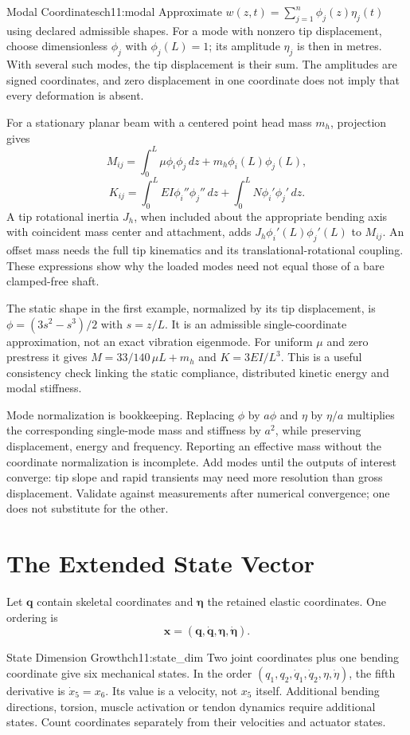 \begin{definition}{Modal Coordinates}{ch11:modal}
Approximate $w(z,t)=\sum_{j=1}^{n}\phi_j(z)\eta_j(t)$ using declared admissible shapes. For a mode with nonzero tip displacement, choose dimensionless $\phi_j$ with $\phi_j(L)=1$; its amplitude $\eta_j$ is then in metres. With several such modes, the tip displacement is their sum. The amplitudes are signed coordinates, and zero displacement in one coordinate does not imply that every deformation is absent.
\end{definition}

For a stationary planar beam with a centered point head mass $m_h$, projection gives
\[
M_{ij}=\int_0^L\mu\phi_i\phi_j\,dz+m_h\phi_i(L)\phi_j(L),
\]
\[
K_{ij}=\int_0^L EI\phi_i''\phi_j''\,dz+
\int_0^L N\phi_i'\phi_j'\,dz.
\]
A tip rotational inertia $J_h$, when included about the appropriate bending axis with coincident mass center and attachment, adds $J_h\phi_i'(L)\phi_j'(L)$ to $M_{ij}$. An offset mass needs the full tip kinematics and its translational-rotational coupling. These expressions show why the loaded modes need not equal those of a bare clamped-free shaft.

The static shape in the first example, normalized by its tip displacement, is $\phi=(3s^2-s^3)/2$ with $s=z/L$. It is an admissible single-coordinate approximation, not an exact vibration eigenmode. For uniform $\mu$ and zero prestress it gives $M=33/140\,\mu L+m_h$ and $K=3EI/L^3$. This is a useful consistency check linking the static compliance, distributed kinetic energy and modal stiffness.

Mode normalization is bookkeeping. Replacing $\phi$ by $a\phi$ and $\eta$ by $\eta/a$ multiplies the corresponding single-mode mass and stiffness by $a^2$, while preserving displacement, energy and frequency. Reporting an effective mass without the coordinate normalization is incomplete. Add modes until the outputs of interest converge: tip slope and rapid transients may need more resolution than gross displacement. Validate against measurements after numerical convergence; one does not substitute for the other.

\section{The Extended State Vector}
Let $\mathbf q$ contain skeletal coordinates and $\boldsymbol\eta$ the retained elastic coordinates. One ordering is
\[
\mathbf x=(\mathbf q,\dot{\mathbf q},\boldsymbol\eta,
\dot{\boldsymbol\eta}).
\]
\begin{example}{State Dimension Growth}{ch11:state_dim}
Two joint coordinates plus one bending coordinate give six mechanical states. In the order $(q_1,q_2,\dot q_1,\dot q_2,\eta,\dot\eta)$, the fifth derivative is $\dot x_5=x_6$. Its value is a velocity, not $x_5$ itself. Additional bending directions, torsion, muscle activation or tendon dynamics require additional states. Count coordinates separately from their velocities and actuator states.
\end{example}

